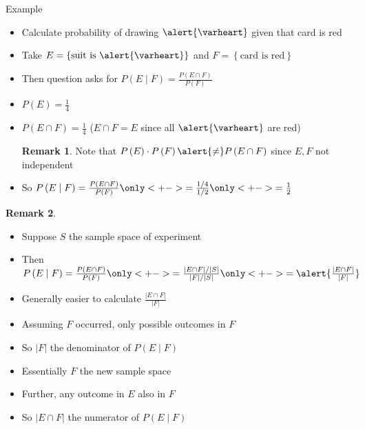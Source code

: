 \documentclass{beamer}
\theoremstyle{definition}
\newtheorem{remark}{Remark}
\begin{document}
\begin{frame}{Example}
\begin{itemize}
\item Calculate probability of drawing $\alert{\varheart}$ given
that card is red
\item Take $E=\left\{\text{suit is $\alert{\varheart}$}\right\}$
and $F=\left\{\text{card is red}\right\}$
\item Then question asks for $P\left(E\mid F\right)
=\frac{P\left(E\cap F\right)}{P\left(F\right)}$
\item $P\left(E\right)=\frac{1}{4}$\qquad
{}
\item $P\left(E\cap F\right)=\frac{1}{4}$\qquad
($E\cap F=E$ since all $\alert{\varheart}$ are red)
\begin{remark}
Note that $P\left(E\right)\cdot P\left(F\right)\alert{\ne}
P\left(E\cap F\right)$
since $E,F$ not independent
\end{remark}
\item So $P\left(E\mid F\right)
=\frac{P\left(E\cap F\right)}{P\left(F\right)}
\only<+->{=\frac{1/4}{1/2}}
\only<+->{=\frac{1}{2}}$
\end{itemize}
\end{frame}

\begin{frame}
\begin{remark}
\begin{itemize}
\item Suppose $S$ the sample space of experiment
\item Then
$P\left(E\mid F\right)=\frac{P\left(E\cap F\right)}{P\left(F\right)}
\only<+->{=\frac{\left|E\cap F\right|/\left|S\right|}
{\left|F\right|/\left|S\right|}}
\only<+->{=\alert{\frac{\left|E\cap F\right|}{\left|F\right|}}}$
\item Generally easier to calculate
$\frac{\left|E\cap F\right|}{\left|F\right|}$
\item Assuming $F$ occurred, only possible outcomes in $F$
\item So $\left|F\right|$ the denominator of $P\left(E\mid F\right)$
\item Essentially $F$ the \alert{new sample space}
\item Further, any outcome in $E$
also in $F$
\item So $\left|E\cap F\right|$ the numerator of
$P\left(E\mid F\right)$
\end{itemize}
\end{remark}
\end{frame}
\end{document}
